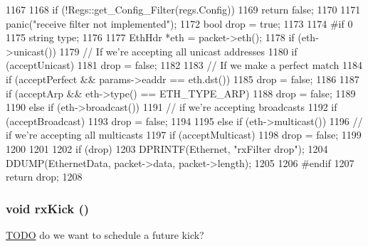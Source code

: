 \begin{DoxyCode}
1167 {
1168     if (!Regs::get_Config_Filter(regs.Config))
1169         return false;
1170 
1171     panic("receive filter not implemented\n");
1172     bool drop = true;
1173 
1174 #if 0
1175     string type;
1176 
1177     EthHdr *eth = packet->eth();
1178     if (eth->unicast()) {
1179         // If we're accepting all unicast addresses
1180         if (acceptUnicast)
1181             drop = false;
1182 
1183         // If we make a perfect match
1184         if (acceptPerfect && params->eaddr == eth.dst())
1185             drop = false;
1186 
1187         if (acceptArp && eth->type() == ETH_TYPE_ARP)
1188             drop = false;
1189 
1190     } else if (eth->broadcast()) {
1191         // if we're accepting broadcasts
1192         if (acceptBroadcast)
1193             drop = false;
1194 
1195     } else if (eth->multicast()) {
1196         // if we're accepting all multicasts
1197         if (acceptMulticast)
1198             drop = false;
1199 
1200     }
1201 
1202     if (drop) {
1203         DPRINTF(Ethernet, "rxFilter drop\n");
1204         DDUMP(EthernetData, packet->data, packet->length);
1205     }
1206 #endif
1207     return drop;
1208 }
\end{DoxyCode}
\hypertarget{classSinic_1_1Device_a5fa946a73db6f59c9819d457c991486a}{
\subsubsection[{rxKick}]{\setlength{\rightskip}{0pt plus 5cm}void rxKick ()}}
\label{classSinic_1_1Device_a5fa946a73db6f59c9819d457c991486a}


\begin{Desc}
\item[\hyperlink{todo__todo000071}{TODO}]do we want to schedule a future kick? \end{Desc}



